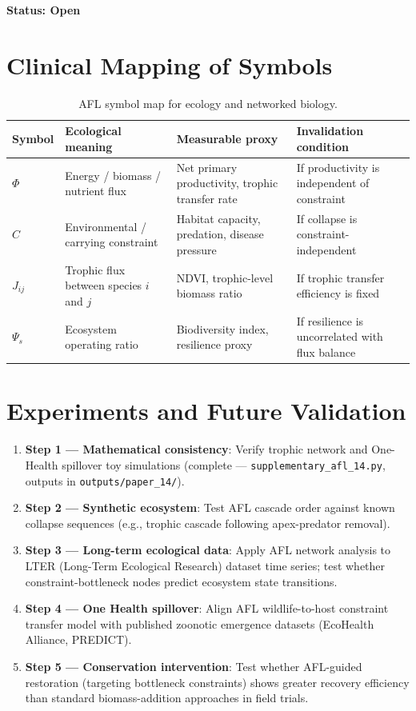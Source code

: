 \documentclass[11pt]{article}
\begin{document}
\textbf{Status: Open}

\section{Clinical Mapping of Symbols}

\begin{table}[h!]
\centering
\caption{AFL symbol map for ecology and networked biology.}
\begin{tabular}{llll}
\toprule
\textbf{Symbol} & \textbf{Ecological meaning} & \textbf{Measurable proxy} & \textbf{Invalidation condition} \\
\midrule
$\Phi$ & Energy / biomass / nutrient flux & Net primary productivity, trophic transfer rate & If productivity is independent of constraint \\
$C$ & Environmental / carrying constraint & Habitat capacity, predation, disease pressure & If collapse is constraint-independent \\
$J_{ij}$ & Trophic flux between species $i$ and $j$ & NDVI, trophic-level biomass ratio & If trophic transfer efficiency is fixed \\
$\Psi_s$ & Ecosystem operating ratio & Biodiversity index, resilience proxy & If resilience is uncorrelated with flux balance \\
\bottomrule
\end{tabular}
\end{table}

\section{Experiments and Future Validation}

\begin{enumerate}
  \item \textbf{Step 1 --- Mathematical consistency}: Verify trophic network and One-Health spillover toy simulations (complete --- \texttt{supplementary\_afl\_14.py}, outputs in \texttt{outputs/paper\_14/}).
  \item \textbf{Step 2 --- Synthetic ecosystem}: Test AFL cascade order against known collapse sequences (e.g., trophic cascade following apex-predator removal).
  \item \textbf{Step 3 --- Long-term ecological data}: Apply AFL network analysis to LTER (Long-Term Ecological Research) dataset time series; test whether constraint-bottleneck nodes predict ecosystem state transitions.
  \item \textbf{Step 4 --- One Health spillover}: Align AFL wildlife-to-host constraint transfer model with published zoonotic emergence datasets (EcoHealth Alliance, PREDICT).
  \item \textbf{Step 5 --- Conservation intervention}: Test whether AFL-guided restoration (targeting bottleneck constraints) shows greater recovery efficiency than standard biomass-addition approaches in field trials.
\end{enumerate}
\end{document}
